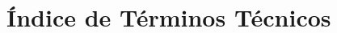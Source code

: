 \documentclass[12pt,a4paper]{article}
\begin{document}
\vspace{1cm}
\section*{Índice de Términos Técnicos}
\vspace{0.5cm}
\begin{multicols}{2}
\printindex
\end{multicols}
\end{document}
